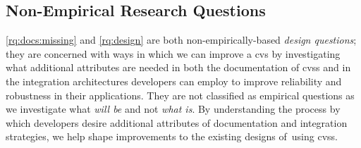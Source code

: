 
\subsection{Non-Empirical Research Questions}
\label{ssec:research-methodology:research-questions:nonempirical}

\ref{rq:docs:missing} and \ref{rq:design} are both non-empirically-based \textit{design questions}; they are concerned with ways in which we can improve a \gls{cvs} by investigating what additional attributes are needed in both the documentation of \glspl{cvs} and in the integration architectures developers can employ to improve reliability and robustness in their applications. They are not classified as empirical questions as we investigate what \textit{will be} and not \textit{what is}. By understanding the process by which developers desire additional attributes of documentation and integration strategies, we help shape improvements to the existing designs of using \glspl{cvs}.